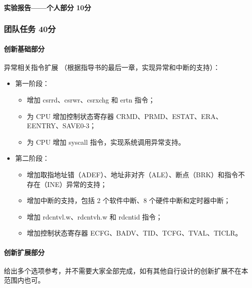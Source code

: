 \paragraph{实验报告——个人部分 10分}

\subsubsection{团队任务 40分}

\paragraph{创新基础部分}

异常相关指令扩展 （根据指导书的最后一章，实现异常和中断的支持）：

\begin{itemize}
    \item 第一阶段：
    \begin{itemize}
        \item 增加 csrrd、csrwr、csrxchg 和 ertn 指令；
        \item 为 CPU 增加控制状态寄存器 CRMD、PRMD、ESTAT、ERA、EENTRY、SAVE0-3；
        \item 为 CPU 增加 syscall 指令，实现系统调用异常支持。
    \end{itemize}
    \item 第二阶段：
    \begin{itemize}
        \item 增加取指地址错（ADEF）、地址非对齐（ALE）、断点（BRK）和指令不存在（INE）异常的支持；
        \item 增加中断的支持，包括 2 个软件中断、8 个硬件中断和定时器中断；
        \item 增加 rdcntvl.w、rdcntvh.w 和 rdcntid 指令；
        \item 增加控制状态寄存器 ECFG、BADV、TID、TCFG、TVAL、TICLR。
    \end{itemize}
\end{itemize}

\paragraph{创新扩展部分}

给出多个选项参考，并不需要大家全部完成，如有其他自行设计的创新扩展不在本范围内也可。

